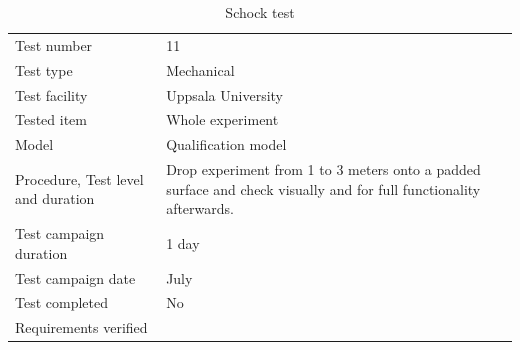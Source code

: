 \documentclass[ %
  a4paper, %
  11pt, %
  openany, %
  parskip, %
  toc=totoc, %
  listof=totoc, %
  bibliography=totoc %
]{scrreprt} %
\providecommand{\DIFaddbeginFL}{} %
\providecommand{\DIFaddendFL}{} %
\providecommand{\DIFdelbeginFL}{} %
\providecommand{\DIFdelendFL}{} %
\providecommand{\DIFscaledelfig}{0.5}
\newlength{\DIFdelgraphicswidth} %
\newlength{\DIFdelgraphicsheight} %
\providecommand{\DIFaddincludegraphics}[2][]{{\color{blue}\fbox{\DIFOincludegraphics[#1]{#2}}}} %
\providecommand{\DIFdelincludegraphics}[2][]{%
\sbox{\DIFdelgraphicsbox}{\DIFOincludegraphics[#1]{#2}}%
\settoboxwidth{\DIFdelgraphicswidth}{\DIFdelgraphicsbox} %
\settoboxtotalheight{\DIFdelgraphicsheight}{\DIFdelgraphicsbox} %
\scalebox{\DIFscaledelfig}{%
\parbox[b]{\DIFdelgraphicswidth}{\usebox{\DIFdelgraphicsbox}\\[-\baselineskip] \rule{\DIFdelgraphicswidth}{0em}}\llap{\resizebox{\DIFdelgraphicswidth}{\DIFdelgraphicsheight}{%
\setlength{\unitlength}{\DIFdelgraphicswidth}%
\begin{picture}(1,1)%
\thicklines\linethickness{2pt} %
{\color[rgb]{1,0,0}\put(0,0){\framebox(1,1){}}}%
{\color[rgb]{1,0,0}\put(0,0){\line( 1,1){1}}}%
{\color[rgb]{1,0,0}\put(0,1){\line(1,-1){1}}}%
\end{picture}%
}\hspace*{3pt}}} %
} %
\DeclareRobustCommand{\DIFaddbeginFL}{\DIFOaddbeginFL \let\includegraphics\DIFaddincludegraphics} %
\DeclareRobustCommand{\DIFaddendFL}{\DIFOaddendFL \let\includegraphics\DIFOincludegraphics} %
\DeclareRobustCommand{\DIFdelbeginFL}{\DIFOdelbeginFL \let\includegraphics\DIFdelincludegraphics} %
\DeclareRobustCommand{\DIFdelendFL}{\DIFOaddendFL \let\includegraphics\DIFOincludegraphics} %
\begin{document}
\begin{table}[H]
\centering
\DIFaddendFL \caption{Schock test}
\DIFdelbeginFL %
\DIFdelendFL \DIFaddbeginFL \label{tab:test_shock}
\begin{tabular}{L{5cm}L{10cm}}
\toprule
Test number & 11 \\
Test type & Mechanical \\
Test facility & Uppsala University \\
Tested item & Whole experiment \\
Model & Qualification model \\
Procedure, Test level and duration & Drop experiment from 1 to 3 meters onto a padded surface and check visually and for full functionality afterwards. \\
Test campaign duration & 1 day \\
Test campaign date & July \\
Test completed & No \\
Requirements verified & \\
\bottomrule
\end{tabular}
\DIFaddendFL \end{table}
\end{document}

